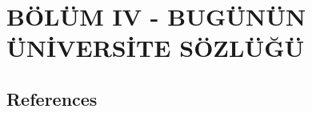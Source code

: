 \documentclass[
  letterpaper,
  DIV=11,
  numbers=noendperiod]{scrreprt}
\begin{document}
\part{BÖLÜM IV - BUGÜNÜN ÜNİVERSİTE SÖZLÜĞÜ}

\chapter{}\label{section-23}


\chapter{}\label{section-24}


\chapter*{References}\label{references}


\label{refs}
\end{document}
